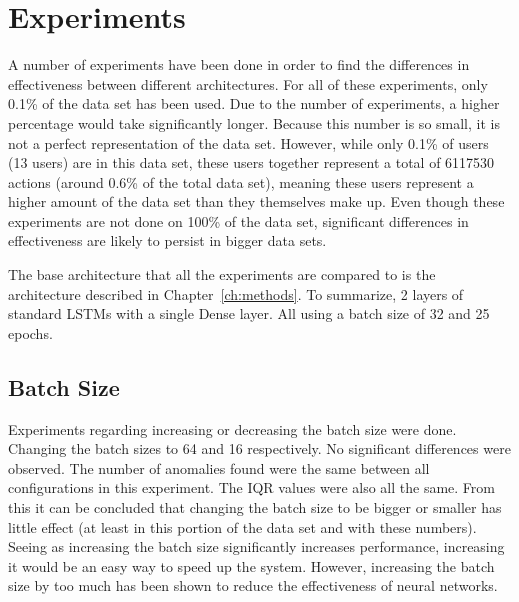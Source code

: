 \chapter{Experiments}\label{ch:experiments}

A number of experiments have been done in order to find the differences in effectiveness between different architectures. For all of these experiments, only 0.1\% of the data set has been used. Due to the number of experiments, a higher percentage would take significantly longer. Because this number is so small, it is not a perfect representation of the data set. However, while only 0.1\% of users (13 users) are in this data set, these users together represent a total of 6117530 actions (around 0.6\% of the total data set), meaning these users represent a higher amount of the data set than they themselves make up. Even though these experiments are not done on 100\% of the data set, significant differences in effectiveness are likely to persist in bigger data sets.

The base architecture that all the experiments are compared to is the architecture described in Chapter~\ref{ch:methods}. To summarize, 2 layers of standard LSTMs with a single Dense layer. All using a batch size of 32 and 25 epochs.

\section{Batch Size}
Experiments regarding increasing or decreasing the batch size were done. Changing the batch sizes to 64 and 16 respectively. No significant differences were observed. The number of anomalies found were the same between all configurations in this experiment. The IQR values were also all the same. From this it can be concluded that changing the batch size to be bigger or smaller has little effect (at least in this portion of the data set and with these numbers). Seeing as increasing the batch size significantly increases performance, increasing it would be an easy way to speed up the system. However, increasing the batch size by too much has been shown to reduce the effectiveness of neural networks.


